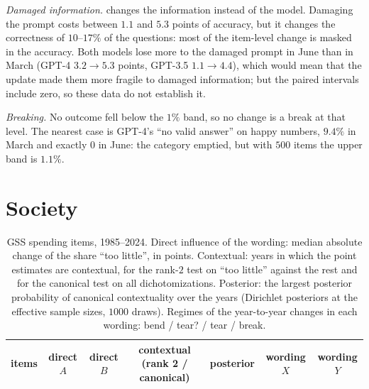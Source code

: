\documentclass[11pt]{article}
\theoremstyle{definition}
\theoremstyle{remark}
\begin{document}
\emph{Damaged information.}  changes the information instead of the model. Damaging the prompt costs between $1.1$ and $5.3$
points of accuracy, but it changes the correctness of $10$--$17\%$ of the questions: most of the item-level change is masked in the
accuracy. Both models lose more to the damaged prompt in June than in March (GPT-4 $3.2\to5.3$ points, GPT-3.5 $1.1\to4.4$), which would
mean that the update made them more fragile to damaged information; but the paired intervals include zero, so these data do not establish it.

\emph{Breaking.} No outcome fell below the $1\%$ band, so no change is a break at that level. The nearest case is GPT-4's ``no valid answer''
on happy numbers, $9.4\%$ in March and exactly $0$ in June: the category emptied, but with $500$ items the upper band is $1.1\%$.

\section{Society}\label{sec:gss}

\begin{table}[ht]
\centering\footnotesize\setlength{\tabcolsep}{4pt}
\caption{GSS spending items, 1985--2024. Direct influence of the wording: median absolute change of the share ``too little'', in points.
Contextual: years in which the point estimates are contextual, for the rank-$2$ test on ``too little'' against the rest and for the
canonical test on all dichotomizations. Posterior: the largest posterior probability of canonical contextuality over the years
(Dirichlet posteriors at the effective sample sizes, $1000$ draws). Regimes of the year-to-year changes in each wording: bend / tear? /
tear / break.}\label{tab:gss}
\begin{tabular}{lcccccc}
\toprule
items & direct $A$ & direct $B$ & contextual (rank 2 / canonical) & posterior & wording $X$ & wording $Y$\\
\midrule

\end{tabular}
\end{table}
\end{document}
